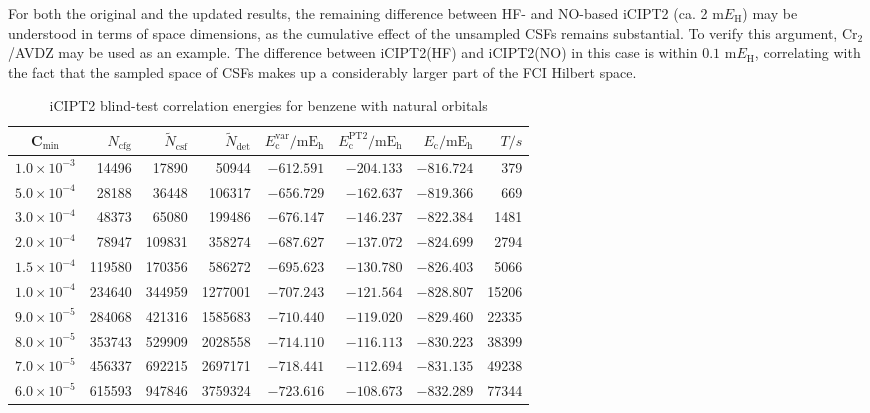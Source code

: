 \documentclass[journal=jcp,manuscript=suppinfo]{achemso}
\begin{document}
For both the original and the updated results, the remaining difference between HF- and NO-based iCIPT2 (ca. 2 m$E_{\text{H}}$) may be understood in terms of space dimensions, as the cumulative effect of the unsampled CSFs remains substantial. To verify this argument, Cr$_2$/AVDZ may be used as an example. The difference between iCIPT2(HF) and iCIPT2(NO) in this case is within $0.1$ m$E_{\text{H}}$, correlating with the fact that the sampled space of CSFs makes up a considerably larger part of the FCI Hilbert space.

\begin{table}[!htp]
	\small
\caption{iCIPT2 blind-test correlation energies for benzene with natural orbitals }
	\begin{threeparttable}
		\centering
	\begin{tabular}{c|rrrrrrr}\toprule
		C$_{\text{min}}$&$N_{\mathrm{cfg}}$&$\tilde{N}_{\mathrm{csf}}$\tnote{a}&$\tilde{N}_{\mathrm{det}}$\tnote{b}
		&$E_{\mathrm{c}}^{\mathrm{var}}/\mathrm{mE_h}$&$E_{\mathrm{c}}^{\mathrm{PT2}}/\mathrm{mE_h}$&$E_{\mathrm{c}}/\mathrm{mE_h}$&$T/s$\tnote{c}\\\toprule
			$1.0\times10^{-3}$ &    14496 &    17890 &  50944&  $-612.591$  &  $-204.133$&  $-816.724$ &379\\
			$5.0\times10^{-4}$ &    28188 &    36448 & 106317&  $-656.729$  &  $-162.637$&  $-819.366$ &669\\
			$3.0\times10^{-4}$ &    48373 &    65080 & 199486&  $-676.147$  &  $-146.237$&  $-822.384$ &1481\\
			$2.0\times10^{-4}$ &    78947 &   109831 & 358274&  $-687.627$  &  $-137.072$&  $-824.699$ &2794\\
			$1.5\times10^{-4}$ &   119580 &   170356 & 586272&  $-695.623$  &  $-130.780$&  $-826.403$ &5066\\
			$1.0\times10^{-4}$ &   234640 &   344959 &1277001&  $-707.243$  &  $-121.564$&  $-828.807$ &15206\\
			$9.0\times10^{-5}$ &   284068 &   421316 &1585683&  $-710.440$  &  $-119.020$&  $-829.460$ &22335\\
			$8.0\times10^{-5}$ &   353743 &   529909 &2028558&  $-714.110$  &  $-116.113$&  $-830.223$ &38399\\
			$7.0\times10^{-5}$ &   456337 &   692215 &2697171&  $-718.441$  &  $-112.694$&  $-831.135$ &49238\\
			$6.0\times10^{-5}$ &   615593 &   947846 &3759324&  $-723.616$  &  $-108.673$&  $-832.289$ &77344\\

\end{tabular}
\end{threeparttable}
\end{table}
\end{document}
